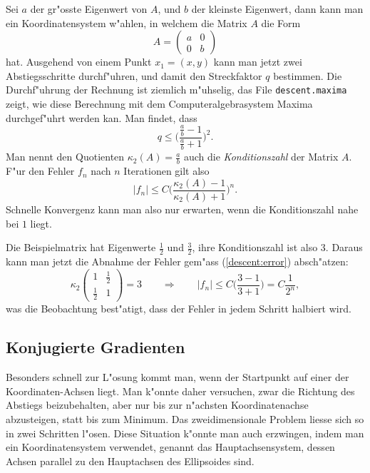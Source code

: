 Sei $a$ der gr"osste Eigenwert von $A$, und $b$ der kleinste Eigenwert,
dann kann man ein Koordinatensystem w"ahlen, in welchem die Matrix $A$
die Form
\[
A=\begin{pmatrix}a&0\\0&b\end{pmatrix}
\]
hat.
Ausgehend von einem Punkt $x_1=(x,y)$ kann man jetzt zwei Abstiegsschritte
durchf"uhren, und damit den Streckfaktor $q$ bestimmen.
Die Durchf"uhrung der Rechnung ist ziemlich m"uhselig, das
File \verb+descent.maxima+ zeigt, wie diese Berechnung mit dem
Computeralgebrasystem Maxima durchgef"uhrt werden kan. Man findet,
dass 
\[
q\le \biggl(\frac{\frac{a}{b}-1}{\frac{a}{b}+1}\biggr)^2.
\]
Man nennt den Quotienten $\kappa_2(A)=\frac{a}{b}$ auch die
{\em Konditionszahl} der Matrix $A$.
F"ur den Fehler $f_n$ nach $n$ Iterationen gilt also
\begin{equation}
|f_n| \le C\biggl(\frac{\kappa_2(A)-1}{\kappa_2(A)+1}\biggr)^n.
\label{descent:error}
\end{equation}
Schnelle Konvergenz kann man also nur erwarten, wenn die Konditionszahl
nahe bei $1$ liegt.

\begin{beispiel}
Die Beispielmatrix hat Eigenwerte $\frac12$ und $\frac32$, ihre
Konditionszahl ist also 3.
Daraus kann man jetzt die Abnahme der Fehler gem"ass (\ref{descent:error})
absch"atzen:
\[
\kappa_2
\begin{pmatrix}1&\frac12\\\frac12&1\end{pmatrix}
=
3\qquad\Rightarrow\qquad
|f_n|\le C\biggl(\frac{3-1}{3+1}\biggr)=C\frac1{2^n},
\]
was die Beobachtung best"atigt, dass der Fehler in jedem Schritt halbiert
wird.
\end{beispiel}

\subsection{Konjugierte Gradienten}
Besonders schnell zur L"osung kommt man, wenn der Startpunkt auf einer
der Koordinaten-Achsen liegt.
Man k"onnte daher versuchen, zwar die Richtung des Abstiegs beizubehalten,
aber nur bis zur n"achsten Koordinatenachse abzusteigen, statt bis zum
Minimum.
Das zweidimensionale Problem liesse sich so in zwei Schritten l"osen.
Diese Situation k"onnte man auch erzwingen, indem man ein
Koordinatensystem verwendet, genannt das Hauptachsensystem,
dessen Achsen parallel zu den Hauptachsen des Ellipsoides sind. 

